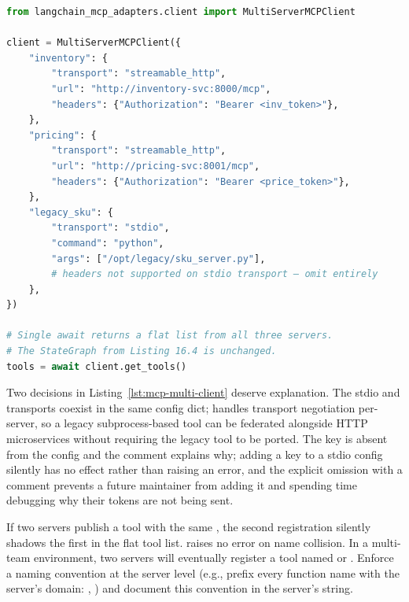 \begin{lstlisting}[language=Python,
                   caption={Three heterogeneous servers in one \code{MultiServerMCPClient}},
                   label={lst:mcp-multi-client}]
from langchain_mcp_adapters.client import MultiServerMCPClient

client = MultiServerMCPClient({
    "inventory": {
        "transport": "streamable_http",
        "url": "http://inventory-svc:8000/mcp",
        "headers": {"Authorization": "Bearer <inv_token>"},
    },
    "pricing": {
        "transport": "streamable_http",
        "url": "http://pricing-svc:8001/mcp",
        "headers": {"Authorization": "Bearer <price_token>"},
    },
    "legacy_sku": {
        "transport": "stdio",
        "command": "python",
        "args": ["/opt/legacy/sku_server.py"],
        # headers not supported on stdio transport — omit entirely
    },
})

# Single await returns a flat list from all three servers.
# The StateGraph from Listing 16.4 is unchanged.
tools = await client.get_tools()
\end{lstlisting}

Two decisions in Listing~\ref{lst:mcp-multi-client} deserve explanation.
The stdio and  transports coexist in the same
config dict;  handles transport negotiation
per-server, so a legacy subprocess-based tool can be federated alongside
HTTP microservices without requiring the legacy tool to be ported.
The  key is absent from the  config
and the comment explains why; adding a  key to a stdio
config silently has no effect rather than raising an error, and the
explicit omission with a comment prevents a future maintainer from
adding it and spending time debugging why their tokens are not being
sent.

\begin{warningbox}
If two servers publish a tool with the same , the second
registration silently shadows the first in the flat tool list.
 raises no error on name collision.
In a multi-team environment, two servers will eventually register a
tool named  or .
Enforce a naming convention at the server level (e.g., prefix every
 function name with the server's domain:
, )
and document this convention in the server's
 string.
\end{warningbox}

